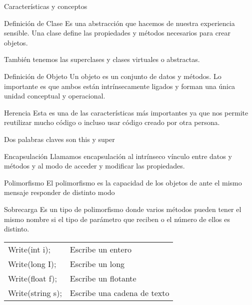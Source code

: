 \documentclass[t]{beamer}
\begin{document}
\begin{frame}[label={sec:org5f2757c}]{Características y conceptos}
\begin{block}{Definición de Clase}
Es una abstracción que hacemos de nuestra experiencia sensible. Una \alert{clase define} las propiedades y métodos necesarios para \alert{crear objetos}.

También tenemos las \alert{superclases y clases virtuales o abstractas}. 
\end{block}

\begin{block}{Definición de Objeto}
Un objeto es un conjunto de datos y métodos. Lo importante es que ambos están intrínsecamente ligados y forman una única unidad conceptual y operacional.
\end{block}
\end{frame}



\begin{frame}[label={sec:orgb4462f1}]{Herencia}
Esta es una de las características más importantes ya que nos permite reutilizar mucho código o incluso usar código creado por otra persona. 

Dos palabras claves son \alert{this} y \alert{super} 
\end{frame}

\begin{frame}[label={sec:org8ef1bf3}]{Encapsulación}
Llamamos encapsulación al \alert{intrínseco vínculo entre datos y métodos} y al modo de acceder y modificar las propiedades. 
\end{frame}

\begin{frame}[label={sec:org38ca51c}]{Polimorfismo}
El polimorfismo es la capacidad de los objetos de ante el mismo mensaje responder de distinto modo
\end{frame}

\begin{frame}[label={sec:org7b4eeb5}]{Sobrecarga}
Es un tipo de polimorfismo donde varios métodos pueden tener el mismo nombre si el tipo de parámetro que reciben o el número de ellos es distinto. 

\begin{center}
\begin{tabular}{ll}
Write(int i); & Escribe un entero\\
Write(long I); & Escribe un long\\
Write(float f); & Escribe un flotante\\
Write(string s); & Escribe una cadena de texto\\
\end{tabular}
\end{center}
\end{frame}
\end{document}
